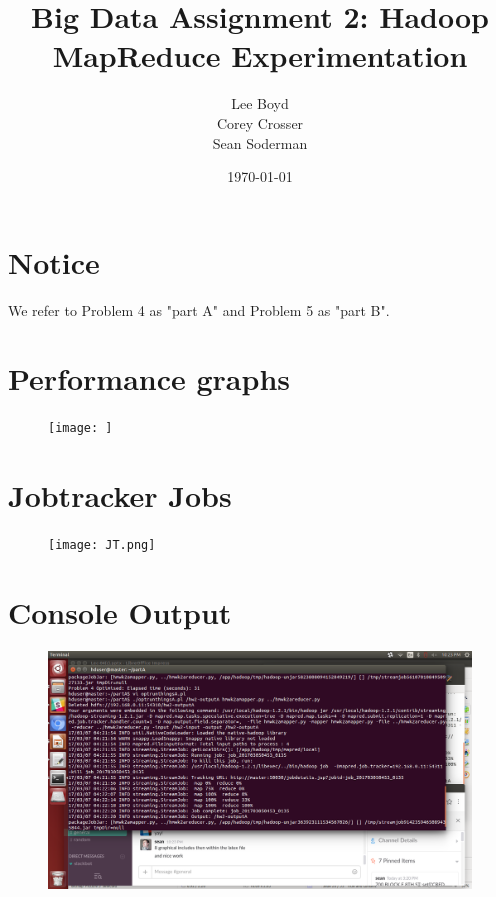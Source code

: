 \documentclass[14pt]{extarticle}
\begin{document}
\title{Big Data Assignment 2: Hadoop MapReduce Experimentation}
\author{Lee Boyd \\
        Corey Crosser \\
        Sean Soderman
        }
\date{\today}
\maketitle

\section{Notice}
We refer to Problem 4 as "part A" and Problem 5 as "part B".

\section{Performance graphs}

\begin{figure}[H]
\centering
\texttt{[image: ]}
\caption{}
\end{figure}


\section{Jobtracker Jobs}
\begin{figure}[H]
\centering
\texttt{[image: JT.png]}
\caption{}
\end{figure}


\section{Console Output}
\begin{figure}[H]
\centering
\includegraphics[width=5.2in]{consolescrnshot.png}
\caption{}
\end{figure}
\end{document}
